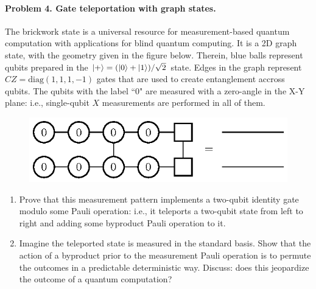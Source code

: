 \documentclass[catalan,spanish,english]{exam}
\begin{document}
\paragraph{Problem 4. Gate teleportation with graph states.}
The brickwork state is a universal resource for measurement-based quantum computation with applications for blind quantum computing. It is a 2D graph state, with the geometry given in the figure below. Therein, blue balls represent qubits prepared in the $\left|+\right\rangle=(\left|0\right\rangle+\left|1\right\rangle)/\sqrt{2}$ state. Edges in the graph represent $CZ=\mathrm{diag}(1,1,1,-1)$ gates that are used to create entanglement accross qubits. The qubits with the label ``0" are measured with a zero-angle in the X-Y plane: i.e., single-qubit $X$ measurements are performed in all of them.
 \begin{figure}[ht] 
 \centering
   \includegraphics{f4}
 \label{Fig:identity}
 \end{figure}
\begin{enumerate}
    \item Prove that this measurement pattern implements a two-qubit identity gate modulo some Pauli operation: i.e., it teleports a two-qubit state from left to right and adding some byproduct Pauli operation to it.
    \item Imagine the teleported state is measured in the standard basis. Show that the action of a byproduct  prior to the measurement Pauli operation is to permute the outcomes in a predictable deterministic way. Discuss: does this jeopardize the outcome of a quantum computation?
\end{enumerate}

\cite{bermejo-vegaNormalizerCircuitsGottesmanKnill2015}

\cite{raussendorfContextualityWignerfunctionNegativity2017a}\cite{manzanoShortIntroductionLindblad2020}





\end{document}
